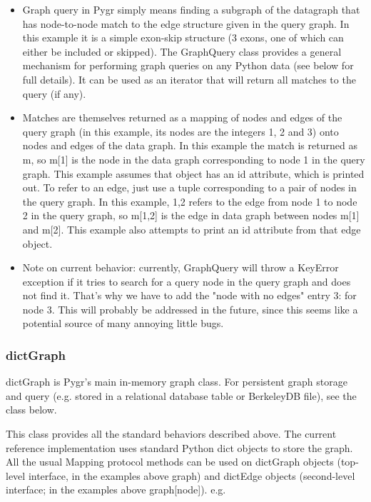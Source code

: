 \documentclass{howto}
\begin{document}
\begin{itemize}
\item         
Graph query in Pygr simply means finding a subgraph of the datagraph that has node-to-node match to the edge structure given in the query graph.  In this example it is a simple exon-skip structure (3 exons, one of which can either be included or skipped).  The GraphQuery class provides a general mechanism for performing graph queries on any Python data (see below for full details).  It can be used as an iterator that will return all matches to the query (if any). 

\item          
Matches are themselves returned as a mapping of nodes and edges of the query graph (in this example, its nodes are the integers 1, 2 and 3) onto nodes and edges of the data graph.  In this example the match is returned as m, so m[1] is the node in the data graph corresponding to node 1 in the query graph.  This example assumes that object has an id attribute, which is printed out.  To refer to an edge, just use a tuple corresponding to a pair of nodes in the query graph.  In this example, 1,2 refers to the edge from node 1 to node 2 in the query graph, so m[1,2] is the edge in data graph between nodes m[1] and m[2].  This example also attempts to print an id attribute from that edge object.

\item         
Note on current behavior: currently, GraphQuery will throw a KeyError exception if it tries to search for a query node in the query graph and does not find it.  That's why we have to add the "node with no edges" entry 3:{} for node 3.  This will probably be addressed in the future, since this seems like a potential source of many annoying little bugs.

\end{itemize}

\subsubsection{dictGraph}

dictGraph is Pygr's main in-memory graph class.  For persistent
graph storage and query (e.g. stored in a relational database table
or BerkeleyDB file), see the  class below.

This class provides all the standard behaviors described above.  The current reference implementation uses standard Python dict objects to store the graph.  All the usual Mapping protocol methods can be used on dictGraph objects (top-level interface, in the examples above graph) and dictEdge objects (second-level interface; in the examples above graph[node]). e.g.
\end{document}
